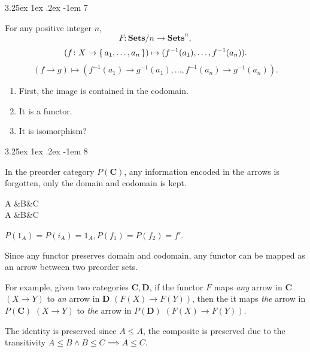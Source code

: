 \documentclass[12pt, letterpaper]{article}
\makeatletter
\renewcommand\subparagraph{\@startsection{subparagraph}{5}{\parindent}%
	{3.25ex \@plus1ex \@minus .2ex}%
	{0.75ex plus 0.1ex}%
	{\normalfont\normalsize\bfseries}}
\newcommand{\bfC}{\mathbf{C}}
\newcommand{\bfD}{\mathbf{D}}
\newcommand{\red}[1]{{\color{red} #1}}
\newenvironment{centikzcd}{\center\tikzcd}{\endtikzcd\endcenter}
\renewcommand\paragraph{\@startsection{paragraph}{4}{\z@}%
	{3.25ex \@plus1ex \@minus.2ex}%
	{-1em}%
	{\normalfont\normalsize\bfseries}}
\renewcommand\subparagraph{\@startsection{subparagraph}{5}{\parindent}%
	{3.25ex \@plus1ex \@minus .2ex}%
	{-1em}%
	{\normalfont\normalsize\bfseries}}
\theoremstyle{definition}
\theoremstyle{remark}
\theoremstyle{definition}
\theoremstyle{plain}
\numberwithin{equation}{section}
\makeatother
\begin{document}
	\paragraph{7}
	
	For any positive integer $n$,
	\[ F\colon\mathbf{Sets}/n\to \mathbf{Sets}^n, \]
	\[ (f\colon X\to \set{a_1,\dots,a_n} )\mapsto (f^{-1}(a_1),\dots,f^{-1}(a_n)).  \]
	\[  (f\to g)\mapsto (f^{-1}(a_1)\to g^{-1}(a_1),\dots, f^{-1}(a_n)\to g^{-1}(a_n)  ) .\]
	
	\begin{enumerate}
		\item 
		First, the image is contained in the codomain.
		
		\item
		It is a functor.
		
		\item \red{It is isomorphism?}
	\end{enumerate}

	\paragraph{8}\label{par:preorder_category}
	
	In the preorder category $P(\bfC)$,
	any information encoded in the arrows is forgotten,
	only the domain and codomain is kept.
	
	\begin{centikzcd}
		 A \ar[r,bend left=45,"f_1"]\ar [r,"f_2"]  \ar[loop,in=140,out=220,looseness=10,"i_A"]
		 &B\ar[l,shift left=2,"g"] &C\ar[l,"h"']\\
		 A \ar[r,shift left=1,"f'"]  
		 &B\ar[l,shift left=1,"g'"] &C\ar[l,"h'"']\\
	\end{centikzcd}

	$P(1_A)=P(i_A)=1_A, P(f_1)=P(f_2)=f'$.
	
	Since any functor preserves domain and codomain,
	any functor can be mapped as an arrow between two preorder sets.
	
	For example, given two categories $\bfC,\bfD$,
	if the functor $F$ maps \textit{any} arrow in $\bfC$ $(X\to Y)$ to \textit{an} arrow in $\bfD$ $(F(X)\to F(Y))$,
	then the it maps \textit{the} arrow in $P(\bfC)$ $(X\to Y)$ to \textit{the} arrow in $P(\bfD)$ $(F(X)\to F(Y))$.
	
	The identity is preserved since $A\le A$, the composite is preserved due to the transitivity $A\le B\land B\le C\implies A\le C$.
	
\end{document}
